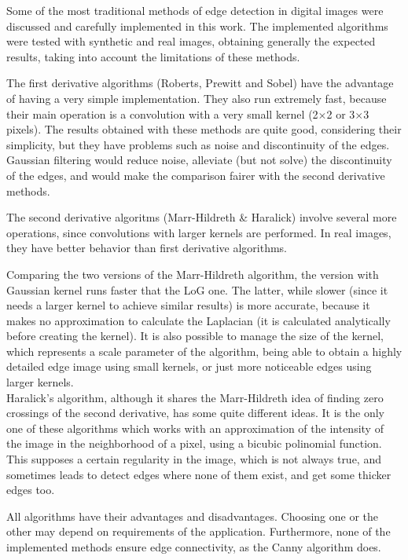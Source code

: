 \documentclass{ipol}
\numberwithin{equation}{section}
\numberwithin{table}{section}
\begin{document}
{Some of the most traditional methods of edge detection in digital images were discussed and carefully implemented in this work. The implemented algorithms were tested with synthetic and real images, obtaining generally the expected results, taking into account the limitations of these methods. 

The first derivative algorithms (Roberts, Prewitt and Sobel) have the advantage of having a very simple implementation. They also run extremely fast, because their main operation is a convolution with a very small kernel (2$\times$2 or 3$\times$3 pixels). The results obtained with these methods are quite good, considering their simplicity, but they have problems such as noise and discontinuity of the edges. Gaussian filtering would reduce noise, alleviate (but not solve) the discontinuity of the edges, and would make the comparison fairer with the second derivative methods. 

The second derivative algoritms (Marr-Hildreth \& Haralick) involve several more operations, since convolutions with larger kernels are performed. In real images, they have better behavior than first derivative algorithms. 

Comparing the two versions of the Marr-Hildreth algorithm, the version with Gaussian kernel runs  faster that the LoG one. The latter, while slower (since it needs a larger kernel to achieve similar results) is more accurate, because it makes no approximation to calculate the Laplacian (it is calculated analytically before creating the kernel). It is also possible to manage the size of the kernel, which represents a scale parameter of the algorithm, being able to obtain a highly detailed edge image using small kernels, or just more noticeable edges using larger kernels. \\

Haralick's algorithm, although it shares the Marr-Hildreth idea of finding zero crossings of the second derivative, has some quite different ideas. It is the only one of these algorithms which works with an approximation of the intensity of the image in the neighborhood of a pixel, using a bicubic polinomial function. This supposes a certain regularity in the image, which is not always true, and sometimes leads to detect edges where none of them exist, and get some thicker edges too. 

All algorithms have their advantages and disadvantages. Choosing one or the other may depend on requirements of the application. Furthermore, none of the implemented methods ensure edge connectivity, as the Canny \cite{Canny1986} algorithm does.

}
\end{document}
